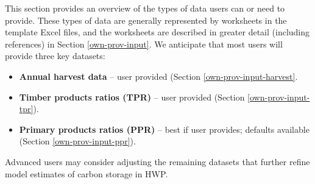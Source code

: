 \documentclass[
  openany]{book}
\providecommand{\tightlist}{%
  \setlength{\itemsep}{0pt}\setlength{\parskip}{0pt}}
\begin{document}
This section provides an overview of the types of data users can or need to provide. These types of data are generally represented by worksheets in the template Excel files, and the worksheets are described in greater detail (including references) in Section \ref{own-prov-input}. We anticipate that most users will provide three key datasets:

\begin{itemize}
\tightlist
\item
  \textbf{Annual harvest data} -- user provided (Section \ref{own-prov-input-harvest}.\\
\item
  \textbf{Timber products ratios (TPR)} -- user provided (Section \ref{own-prov-input-tpr}).\\
\item
  \textbf{Primary products ratios (PPR)} -- best if user provides; defaults available (Section \ref{own-prov-input-ppr}).
\end{itemize}

Advanced users may consider adjusting the remaining datasets that further refine model estimates of carbon storage in HWP.
\end{document}

